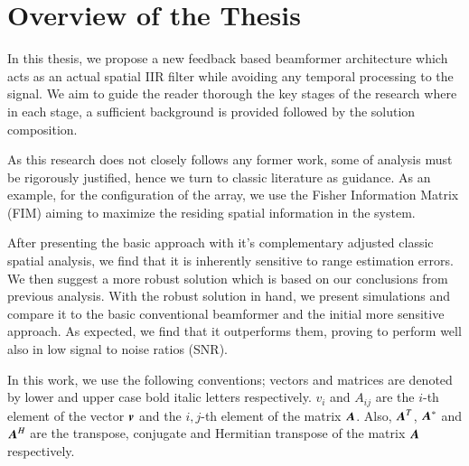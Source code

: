\section{Overview of the Thesis}
In this thesis, we propose a new feedback based beamformer architecture which acts as an actual spatial IIR filter while avoiding any temporal processing to the signal.
We aim to guide the reader thorough the key stages of the research where in each stage, a sufficient background is provided followed by the solution composition.
\par As this research does not closely follows any former work, some of analysis must be rigorously justified, hence we turn to classic literature as guidance.
As an example, for the configuration of the array, we use the Fisher Information Matrix (FIM) aiming to maximize the residing spatial information in the system.
\par After presenting the basic approach with it's complementary adjusted classic spatial analysis, we find that it is inherently sensitive to range estimation errors.
We then suggest a more robust solution which is based on our conclusions from previous analysis.
With the robust solution in hand, we present simulations and compare it to the basic conventional beamformer and the initial more sensitive approach.
As expected, we find that it outperforms them, proving to perform well also in low signal to noise ratios (SNR).
\par In this work, we use the following conventions; vectors and matrices are denoted by lower and upper case bold italic letters respectively. 
$v_{i}$ and $A_{ij}$ are the $i$-th element of the vector $\boldsymbol{v}$ and the $i,j$-th element of the matrix $\boldsymbol{A}$.
Also, $\boldsymbol{A}^{T}$, $\boldsymbol{A}^{*}$ and $\boldsymbol{A}^{H}$ are the transpose, conjugate and Hermitian transpose of the matrix $\boldsymbol{A}$ respectively.
